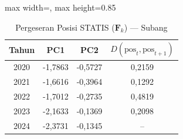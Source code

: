\begin{table}[H]
\centering
\caption{Pergeseran Posisi STATIS ($\mathbf{F}_k$) --- Subang} \label{tab:app1jarak_statis_skor_subang}
\begin{adjustbox}{max width=\textwidth, max height=0.85\textheight}
\begin{tabular}{|c|c|c|c|}
\hline
\textbf{Tahun} & \textbf{PC1} & \textbf{PC2} & \textbf{$D(\text{pos}_t, \text{pos}_{t+1})$} \\
\hline
2020 & -1,7863 & -0,5727 & 0,2159 \\
2021 & -1,6616 & -0,3964 & 0,1292 \\
2022 & -1,7012 & -0,2735 & 0,4819 \\
2023 & -2,1633 & -0,1369 & 0,2098 \\
2024 & -2,3731 & -0,1345 & -- \\
\hline
\end{tabular}
\end{adjustbox}
\end{table}